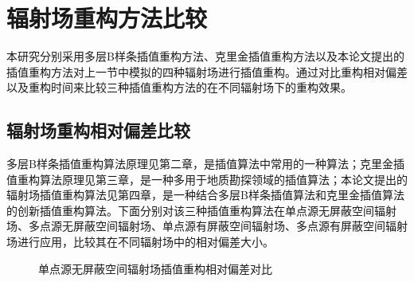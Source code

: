 \section{辐射场重构方法比较}
本研究分别采用多层B样条插值重构方法、克里金插值重构方法以及本论文提出的插值重构方法对上一节中模拟的四种辐射场进行插值重构。通过对比重构相对偏差以及重构时间来比较三种插值重构方法的在不同辐射场下的重构效果。

\subsection{辐射场重构相对偏差比较}
多层B样条插值重构算法原理见第二章，是插值算法中常用的一种算法；克里金插值重构算法原理见第三章，是一种多用于地质勘探领域的插值算法；本论文提出的辐射场插值重构算法见第四章，是一种结合多层B样条插值算法和克里金插值算法的创新插值重构算法。下面分别对该三种插值重构算法在单点源无屏蔽空间辐射场、多点源无屏蔽空间辐射场、单点源有屏蔽空间辐射场、多点源有屏蔽空间辐射场进行应用，比较其在不同辐射场中的相对偏差大小。

\begin{figure}[htbp]
    \centering
    \caption{单点源无屏蔽空间辐射场插值重构相对偏差对比}
    \label{单点源无屏蔽空间辐射场插值重构相对偏差对比}
\end{figure}

